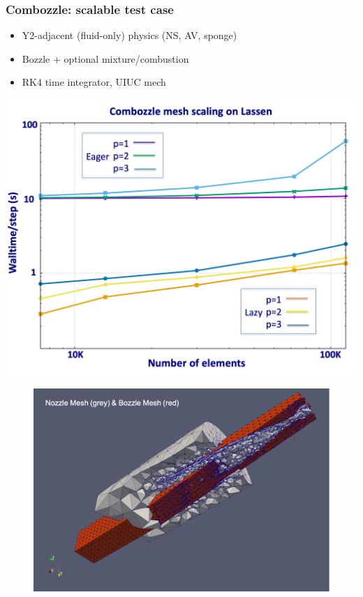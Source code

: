 \begin{frame}\frametitle{Combozzle: scalable test case}
  \begin{minipage}{0.45\textwidth}		
    \begin{itemize}
    \item Y2-adjacent (fluid-only) physics (NS, AV, sponge)
    \item Bozzle + optional mixture/combustion
    \item RK4 time integrator, UIUC mech
    \end{itemize}
    \includegraphics[width=\textwidth]{figures/combozzle_gridscale.png}
  \end{minipage}
  \begin{minipage}{0.5\textwidth}
    \begin{figure}
      \centering
      \includegraphics[width=\textwidth]{figures/bono2.png} \\

\end{figure}
\end{minipage}
\end{frame}

